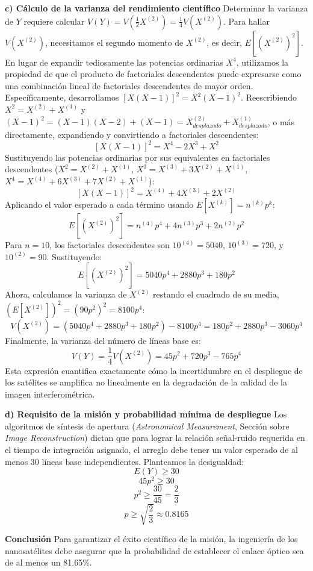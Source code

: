 \textbf{c) Cálculo de la varianza del rendimiento científico}
Determinar la varianza de $Y$ requiere calcular $V(Y) = V\left(\frac{1}{2} X^{(2)}\right) = \frac{1}{4} V(X^{(2)})$. 
Para hallar $V(X^{(2)})$, necesitamos el segundo momento de $X^{(2)}$, es decir, $E[(X^{(2)})^2]$. En lugar de expandir tediosamente las potencias ordinarias $X^4$, utilizamos la propiedad de que el producto de factoriales descendentes puede expresarse como una combinación lineal de factoriales descendentes de mayor orden. 
Específicamente, desarrollamos $[X(X-1)]^2 = X^2(X-1)^2$. Reescribiendo $X^2 = X^{(2)} + X^{(1)}$ y $(X-1)^2 = (X-1)(X-2) + (X-1) = X^{(2)}_{desplazado} + X^{(1)}_{desplazado}$, o más directamente, expandiendo y convirtiendo a factoriales descendentes:
$$ [X(X-1)]^2 = X^4 - 2X^3 + X^2 $$
Sustituyendo las potencias ordinarias por sus equivalentes en factoriales descendentes ($X^2 = X^{(2)} + X^{(1)}$, $X^3 = X^{(3)} + 3X^{(2)} + X^{(1)}$, $X^4 = X^{(4)} + 6X^{(3)} + 7X^{(2)} + X^{(1)}$):
$$ [X(X-1)]^2 = X^{(4)} + 4X^{(3)} + 2X^{(2)} $$
Aplicando el valor esperado a cada término usando $E[X^{(k)}] = n^{(k)} p^k$:
$$ E[(X^{(2)})^2] = n^{(4)}p^4 + 4n^{(3)}p^3 + 2n^{(2)}p^2 $$
Para $n=10$, los factoriales descendentes son $10^{(4)} = 5040$, $10^{(3)} = 720$, y $10^{(2)} = 90$. Sustituyendo:
$$ E[(X^{(2)})^2] = 5040 p^4 + 2880 p^3 + 180 p^2 $$
Ahora, calculamos la varianza de $X^{(2)}$ restando el cuadrado de su media, $(E[X^{(2)}])^2 = (90p^2)^2 = 8100p^4$:
$$ V(X^{(2)}) = (5040 p^4 + 2880 p^3 + 180 p^2) - 8100 p^4 = 180 p^2 + 2880 p^3 - 3060 p^4 $$
Finalmente, la varianza del número de líneas base es:
$$ V(Y) = \frac{1}{4} V(X^{(2)}) = 45 p^2 + 720 p^3 - 765 p^4 $$
Esta expresión cuantifica exactamente cómo la incertidumbre en el despliegue de los satélites se amplifica no linealmente en la degradación de la calidad de la imagen interferométrica.

\textbf{d) Requisito de la misión y probabilidad mínima de despliegue}
Los algoritmos de síntesis de apertura (\textit{Astronomical Measurement}, Sección sobre \textit{Image Reconstruction}) dictan que para lograr la relación señal-ruido requerida en el tiempo de integración asignado, el arreglo debe tener un valor esperado de al menos 30 líneas base independientes. 
Planteamos la desigualdad:
$$ E(Y) \ge 30 $$
$$ 45 p^2 \ge 30 $$
$$ p^2 \ge \frac{30}{45} = \frac{2}{3} $$
$$ p \ge \sqrt{\frac{2}{3}} \approx 0.8165 $$

\textbf{Conclusión}
Para garantizar el éxito científico de la misión, la ingeniería de los nanosatélites debe asegurar que la probabilidad de establecer el enlace óptico sea de al menos un 81.65\%.
